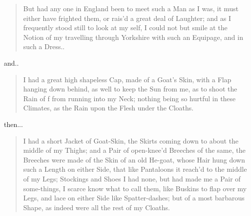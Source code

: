 \documentclass[a4paper]{article}
\begin{document}
\noindent
\begin{minipage}{1\textwidth}
\vspace{1em}
\begin{quotation}
{\ttfamily

But had any one in England been to meet such a Man as I was, it must either have frighted them, or rais’d a great deal of Laughter; and as I frequently stood still to look at my self, I could not but smile at the Notion of my travelling through Yorkshire with such an Equipage, and in such a Dress..

}
\end{quotation}
\vspace{1em}
\end{minipage}


and..

\noindent
\begin{minipage}{1\textwidth}
\vspace{1em}
\begin{quotation}
{\ttfamily

I had a great high shapeless Cap, made of a Goat’s Skin, with a Flap hanging down behind, as well to keep the Sun from me, as to shoot the Rain of f from running into my Neck; nothing being so hurtful in these Climates, as the Rain upon the Flesh under the Cloaths. 

}
\end{quotation}
\vspace{1em}
\end{minipage}


then...


\noindent
\begin{minipage}{1\textwidth}
\vspace{1em}
\begin{quotation}
{\ttfamily

I had a short Jacket of Goat-Skin, the Skirts coming down to about the middle of my Thighs; and a Pair of open-knee’d Breeches of the same, the Breeches were made of the Skin of an old He-goat, whose Hair hung down such a Length on either Side, that like Pantaloons it reach’d to the middle of my Legs; Stockings and Shoes I had none, but had made me a Pair of some-things, I scarce know what to call them, like Buskins to flap over my Legs, and lace on either Side like Spatter-dashes; but of a most barbarous Shape, as indeed were all the rest of my Cloaths.

}
\end{quotation}
\vspace{1em}
\end{minipage}
\end{document}
